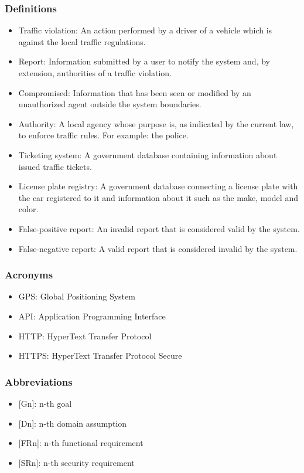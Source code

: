 \subsubsection{Definitions} \label{sub-sect:definitions}
\begin{itemize}
    \item Traffic violation: An action performed by a driver of a vehicle which is against the local traffic regulations.
    \item Report: Information submitted by a user to notify the system and, by extension, authorities of a traffic violation.
    \item Compromised: Information that has been seen or modified by an unauthorized agent outside the system boundaries.
    \item Authority: A local agency whose purpose is, as indicated by the current law, to enforce traffic rules. For example: the police.
    \item Ticketing system: A government database containing information about issued traffic tickets.
    \item License plate registry: A government database connecting a license plate with the car registered to it and information about it such as the make, model and color.
    \item False-positive report: An invalid report that is considered valid by the system.
    \item False-negative report: A valid report that is considered invalid by the system.
\end{itemize}

\subsubsection{Acronyms} \label{sub-sect:acronyms}
\begin{itemize}
    \item GPS: Global Positioning System
    \item API: Application Programming Interface
    \item HTTP: HyperText Transfer Protocol
    \item HTTPS: HyperText Transfer Protocol Secure
\end{itemize}

\subsubsection{Abbreviations}
\begin{itemize}
    \item {[Gn]}: n-th goal
    \item {[Dn]}: n-th domain assumption 
    \item {[FRn]}: n-th functional requirement
    \item {[SRn]}: n-th security requirement
\end{itemize}


